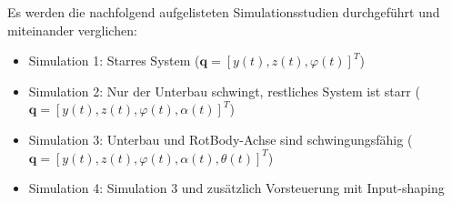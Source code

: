 \documentclass[10pt,a4paper]{iace.report}
\begin{document}
			Es werden die nachfolgend aufgelisteten Simulationsstudien durchgeführt und miteinander verglichen:
			\begin{itemize}
				\item \textcolor{blue!60!black}{Simulation 1:} Starres System ($ \bm{q}=[y(t), z(t), \varphi(t)]^{T} $)
				\item \textcolor{blue!60!black}{Simulation 2:} Nur der Unterbau schwingt, restliches System ist starr ($ \bm{q}=[y(t), z(t), \varphi(t), \alpha(t)]^{T} $)
				\item \textcolor{blue!60!black}{Simulation 3:} Unterbau und RotBody-Achse sind schwingungsfähig ($ \bm{q}=[y(t), z(t), \varphi(t), \alpha(t), \theta(t)]^{T} $)
				\item \textcolor{blue!60!black}{Simulation 4:} Simulation 3 und zusätzlich Vorsteuerung mit Input-shaping	
			\end{itemize}
			
\end{document}
